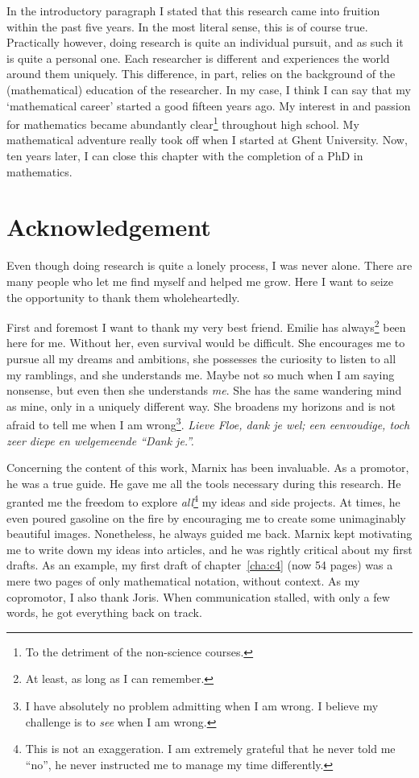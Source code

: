 In the introductory paragraph I stated that this research came into fruition within the past five years. In the most literal sense, this is of course true. Practically however, doing research is quite an individual pursuit, and as such it is quite a personal one. Each researcher is different and experiences the world around them uniquely. This difference, in part, relies on the background of the (mathematical) education of the researcher. In my case, I think I can say that my `mathematical career' started a good fifteen years ago. My interest in and passion for mathematics became abundantly clear\footnote{To the detriment of the non-science courses.} throughout high school. My mathematical adventure really took off when I started at Ghent University. Now, ten years later, I can close this chapter with the completion of a PhD in mathematics.


\section*{Acknowledgement}

Even though doing research is quite a lonely process, I was never alone. There are many people who let me find myself and helped me grow. Here I want to seize the opportunity to thank them wholeheartedly.

First and foremost I want to thank my very best friend. Emilie has always\footnote{At least, as long as I can remember.} been here for me. Without her, even survival would be difficult. She encourages me to pursue all my dreams and ambitions, she possesses the curiosity to listen to all my ramblings, and she understands me. Maybe not so much when I am saying nonsense, but even then she understands \emph{me}. She has the same wandering mind as mine, only in a uniquely different way. She broadens my horizons and is not afraid to tell me when I am wrong\footnote{I have absolutely no problem admitting when I am wrong. I believe my challenge is to \emph{see} when I am wrong.}. \emph{\foreignlanguage{dutch}{Lieve Floe, dank je wel; een eenvoudige, toch zeer diepe en welgemeende ``Dank je.''.}}

Concerning the content of this work, Marnix has been invaluable. As a promotor, he was a true guide. He gave me all the tools necessary during this research. He granted me the freedom to explore \emph{all}\footnote{This is not an exaggeration. I am extremely grateful that he never told me ``no'', he never instructed me to manage my time differently.} my ideas and side projects. At times, he even poured gasoline on the fire by encouraging me to create some unimaginably beautiful images. Nonetheless, he always guided me back. Marnix kept motivating me to write down my ideas into articles, and he was rightly critical about my first drafts. As an example, my first draft of chapter~\ref{cha:c4} (now 54 pages) was a mere two pages of only mathematical notation, without context. As my copromotor, I also thank Joris. When communication stalled, with only a few words, he got everything back on track.

